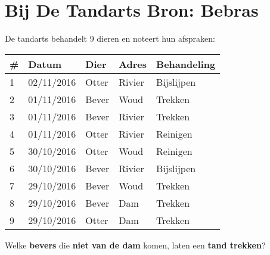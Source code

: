 \documentclass[12pt, a4paper]{article}
\begin{document}
	\begin{minipage}{\textwidth}
		\section{Bij De Tandarts \hfill\small Bron: Bebras}
			De tandarts behandelt 9 dieren en noteert hun afspraken:
			
			\begin{table}[H]
				\centering
				\begin{tabular}{|l|l|l|l|l|}
					\hline
					\# & \textbf{Datum} & \textbf{Dier} & \textbf{Adres} & \textbf{Behandeling} \\ \hline\hline
					1 &02/11/2016 & Otter & Rivier & Bijslijpen \\
					2 &01/11/2016 & Bever & Woud & Trekken \\
					3 &01/11/2016 & Bever & Rivier & Trekken \\	
					4 &01/11/2016 & Otter & Rivier & Reinigen \\
					5 &30/10/2016 & Otter & Woud & Reinigen \\
					6 &30/10/2016 & Bever & Rivier & Bijslijpen \\
					7 &29/10/2016 & Bever & Woud & Trekken \\
					8 &29/10/2016 & Bever & Dam & Trekken \\
					9 &29/10/2016 & Otter & Dam & Trekken \\
					\hline 
				\end{tabular}
			\end{table}
			
			Welke \textbf{bevers} die \textbf{niet van de dam} komen, laten een \textbf{tand trekken}?

	\end{minipage} \\ \\ 
		
\end{document}
